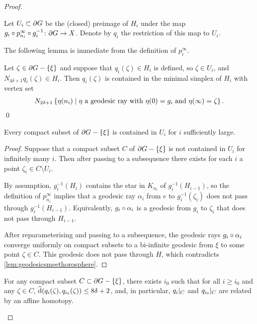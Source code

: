 \documentclass[a4paper]{article}
\begin{document}
\begin{proof}
\begin{definition}
  Let $U_i \subset \partial G$ be the (closed) preimage of $H_i$ under the map 
  $g_i \circ p^\infty_{n_i} \circ g_i^{-1} \colon \partial G \to X$.
  Denote by $q_i$ the restriction of this map to $U_i$.
\end{definition}

The following lemma is immediate from the definition of $p^\infty_i$.

\begin{lemma}\label{lem:describing_q_i}
  Let $\zeta \in \partial G - \left\{\xi\right\}$ and suppose that $q_i(\zeta) \in H_i$
  is defined, so $\zeta \in U_i$, and $N_{4\delta+1} q_i(\zeta) \in H_i$. Then
  $q_i(\zeta)$ is contained in the minimal simplex of $H_i$ with vertex set
  \begin{align*}
    N_{2\delta+1} \left\{\eta(n_i)\mid\text{$\eta$ a geodesic ray with
    $\eta(0) = g_i$ and $\eta(\infty) = \zeta$}\right\}.
  \end{align*}\qed
\end{lemma}

\begin{lemma}
  Every compact subset of $\partial G - \left\{\xi\right\}$ is contained in $U_i$ for 
  $i$ sufficiently large.
\end{lemma} 

\begin{proof}
  Suppose that a compact subset $C$ of $\partial G - \left\{\xi\right\}$ is not contained
  in $U_i$ for infinitely many $i$. Then after passing to a subsequence there
  exists for each $i$ a point $\zeta_i \in C\setminus U_i$. 

  By assumption, $g_i^{-1}(H_i)$ contains the star in $K_{n_i}$ of 
  $g_i^{-1}(H_{i-1})$, so the definition of $p^\infty_{n_i}$ implies that a 
  geodesic ray $\alpha_i$ from $e$ to $g_i^{-1}(\zeta_i)$ does not pass through 
  $g_i^{-1}(H_{i-1})$. Equivalently, $g_i\circ\alpha_i$ is a geodesic from 
  $g_i$ to $\zeta_i$ that does not pass through $H_{i-1}$. 

  After reparameterising and passing to a subsequence, the geodesic rays
  $g_i\circ\alpha_i$ converge uniformly on compact subsets to a bi-infinite
  geodesic from $\xi$ to some point $\zeta \in C$.  This geodesic does not pass
  through $H$, which contradicts \cref{lem:geodesicsmeethorosphere}.
\end{proof}

\begin{lemma}\label{lem:affinehomotopic}
  For any compact subset $C\subset\partial G - \left\{\xi\right\}$, there exists $i_0$ 
  such that for all $i \geq i_0$ and any $\zeta \in C$, $\operatorname{\widehat{d}}(q_i(\zeta),
  q_{i_0}(\zeta)) \leq 8\delta + 2$, and, in particular, $q_i\vert_{C}$
  and $q_{i_0}\vert_{C}$ are related by an affine homotopy.
\end{lemma}


\end{proof}
\end{document}
